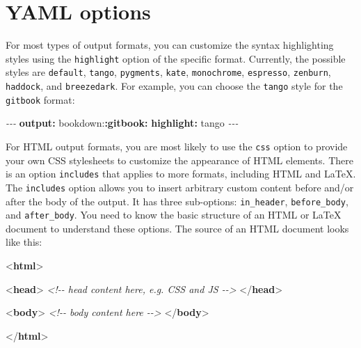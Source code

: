 \documentclass[
  12pt,
]{krantz}
\newenvironment{Shaded}{\begin{snugshade}}{\end{snugshade}}
\newcommand{\AttributeTok}[1]{\textcolor[rgb]{0.13,0.29,0.53}{#1}}
\newcommand{\CommentTok}[1]{\textcolor[rgb]{0.56,0.35,0.01}{\textit{#1}}}
\newcommand{\DataTypeTok}[1]{\textcolor[rgb]{0.13,0.29,0.53}{#1}}
\newcommand{\FunctionTok}[1]{\textcolor[rgb]{0.13,0.29,0.53}{\textbf{#1}}}
\newcommand{\KeywordTok}[1]{\textcolor[rgb]{0.13,0.29,0.53}{\textbf{#1}}}
\newcommand{\PreprocessorTok}[1]{\textcolor[rgb]{0.56,0.35,0.01}{\textit{#1}}}
\theoremstyle{definition}
\theoremstyle{definition}
\theoremstyle{definition}
\theoremstyle{definition}
\theoremstyle{remark}
\begin{document}
\section{YAML options}\label{yaml-options}

For most types of output formats, you can customize the syntax highlighting styles using the \texttt{highlight} option of the specific format. Currently, the possible styles are \texttt{default}, \texttt{tango}, \texttt{pygments}, \texttt{kate}, \texttt{monochrome}, \texttt{espresso}, \texttt{zenburn}, \texttt{haddock}, and \texttt{breezedark}. For example, you can choose the \texttt{tango} style for the \texttt{gitbook} format:

\begin{Shaded}
\begin{Highlighting}[]
\PreprocessorTok{{-}{-}{-}}
\FunctionTok{output}\KeywordTok{:}
\AttributeTok{  bookdown:}\FunctionTok{:gitbook}\KeywordTok{:}
\AttributeTok{    }\FunctionTok{highlight}\KeywordTok{:}\AttributeTok{ tango}
\PreprocessorTok{{-}{-}{-}}
\end{Highlighting}
\end{Shaded}

For HTML output formats, you are most likely to use the \texttt{css} option to provide your own CSS stylesheets to customize the appearance of HTML elements. There is an option \texttt{includes} that applies to more formats, including HTML and LaTeX. The \texttt{includes} option allows you to insert arbitrary custom content before and/or after the body of the output. It has three sub-options: \texttt{in\_header}, \texttt{before\_body}, and \texttt{after\_body}. You need to know the basic structure of an HTML or LaTeX document to understand these options. The source of an HTML document looks like this:

\begin{Shaded}
\begin{Highlighting}[]
\DataTypeTok{\textless{}}\KeywordTok{html}\DataTypeTok{\textgreater{}}
  
  \DataTypeTok{\textless{}}\KeywordTok{head}\DataTypeTok{\textgreater{}}
  \CommentTok{\textless{}!{-}{-} head content here, e.g. CSS and JS {-}{-}\textgreater{}}
  \DataTypeTok{\textless{}/}\KeywordTok{head}\DataTypeTok{\textgreater{}}
  
  \DataTypeTok{\textless{}}\KeywordTok{body}\DataTypeTok{\textgreater{}}
  \CommentTok{\textless{}!{-}{-} body content here {-}{-}\textgreater{}}
  \DataTypeTok{\textless{}/}\KeywordTok{body}\DataTypeTok{\textgreater{}}

\DataTypeTok{\textless{}/}\KeywordTok{html}\DataTypeTok{\textgreater{}}
\end{Highlighting}
\end{Shaded}
\end{document}
